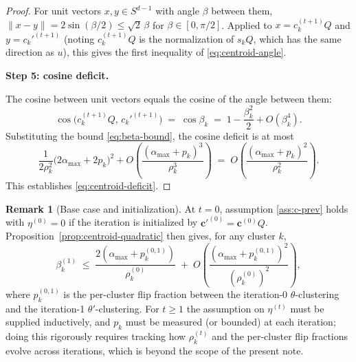 \documentclass[11pt,letterpaper]{article}
\theoremstyle{definition}
\newtheorem{remark}[theorem]{Remark}
\DeclareMathOperator{\cossim}{cos}
\begin{document}
\begin{proof}
For unit vectors $x, y \in S^{d-1}$ with angle $\beta$ between them, $\|x - y\| = 2 \sin(\beta/2) \leq \sqrt{2} \, \beta$ for $\beta \in [0, \pi/2]$. Applied to $x = c_k^{(t+1)} Q$ and $y = c_k'^{(t+1)}$ (noting $c_k^{(t+1)} Q$ is the normalization of $s_k Q$, which has the same direction as $u$), this gives the first inequality of \eqref{eq:centroid-angle}.

\textbf{Step 5: cosine deficit.}

The cosine between unit vectors equals the cosine of the angle between them:
\[
\cossim\!\big( c_k^{(t+1)} Q, \, c_k'^{(t+1)} \big) \;=\; \cos \beta_k \;=\; 1 - \frac{\beta_k^2}{2} + O(\beta_k^4).
\]
Substituting the bound \eqref{eq:beta-bound}, the cosine deficit is at most
\[
\frac{1}{2\rho_k^2} \big( 2\alpha_{\max} + 2 p_k \big)^2 + O\!\left( \frac{(\alpha_{\max} + p_k)^3}{\rho_k^3} \right) \;=\; O\!\left( \frac{(\alpha_{\max} + p_k)^2}{\rho_k^2} \right).
\]
This establishes \eqref{eq:centroid-deficit}.
\end{proof}

\begin{remark}[Base case and initialization]
\label{rem:centroid-base-case}
At $t = 0$, assumption \ref{ass:c-prev} holds with $\eta^{(0)} = 0$ if the iteration is initialized by $\mathbf{c}'^{(0)} = \mathbf{c}^{(0)} Q$. Proposition~\ref{prop:centroid-quadratic} then gives, for any cluster $k$,
\[
\beta_k^{(1)} \;\leq\; \frac{2(\alpha_{\max} + p_k^{(0,1)})}{\rho_k^{(0)}} \;+\; O\!\left( \frac{(\alpha_{\max} + p_k^{(0,1)})^2}{(\rho_k^{(0)})^2} \right),
\]
where $p_k^{(0,1)}$ is the per-cluster flip fraction between the iteration-0 $\theta$-clustering and the iteration-1 $\theta'$-clustering. For $t \geq 1$ the assumption on $\eta^{(t)}$ must be supplied inductively, and $p_k$ must be measured (or bounded) at each iteration; doing this rigorously requires tracking how $\rho_k^{(t)}$ and the per-cluster flip fractions evolve across iterations, which is beyond the scope of the present note.
\end{remark}
\end{document}
